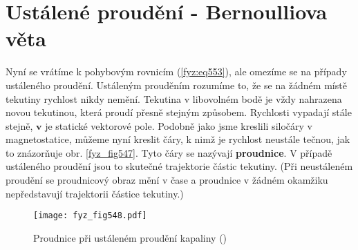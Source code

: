 {  \section{Ustálené proudění - Bernoulliova věta}\label{fyz:IIchapXLsecIII}
    Nyní se vrátíme k pohybovým rovnicím (\ref{fyz:eq553}), ale omezíme se na případy ustáleného 
    proudění. Ustáleným prouděním rozumíme to, že se na žádném místě tekutiny rychlost nikdy 
    nemění. Tekutina v libovolném bodě je vždy nahrazena novou tekutinou, která proudí přesně 
    stejným způsobem. Rychlosti vypadají stále stejně, \(\bm{v}\) je statické vektorové pole. 
    Podobně jako jsme kreslili siločáry v magnetostatice, můžeme nyní kreslit čáry, k nimž je 
    rychlost neustále tečnou, jak to znázorňuje obr. \ref{fyz_fig547}. Tyto čáry se nazývají 
    \textbf{proudnice}. V případě ustáleného proudění jsou to skutečné trajektorie částic tekutiny. 
    (Při neustáleném proudění se proudnicový obraz mění v čase a proudnice v žádném okamžiku 
    nepředstavují trajektorii částice tekutiny.)
    
    \begin{figure}[ht!] %
      \centering
      \texttt{[image: fyz\_fig548.pdf]}
      \caption{Proudnice při ustáleném proudění kapaliny
               (\cite[s.~747]{Feynman02})}
      \label{fyz_fig548}
    \end{figure}
    
}
